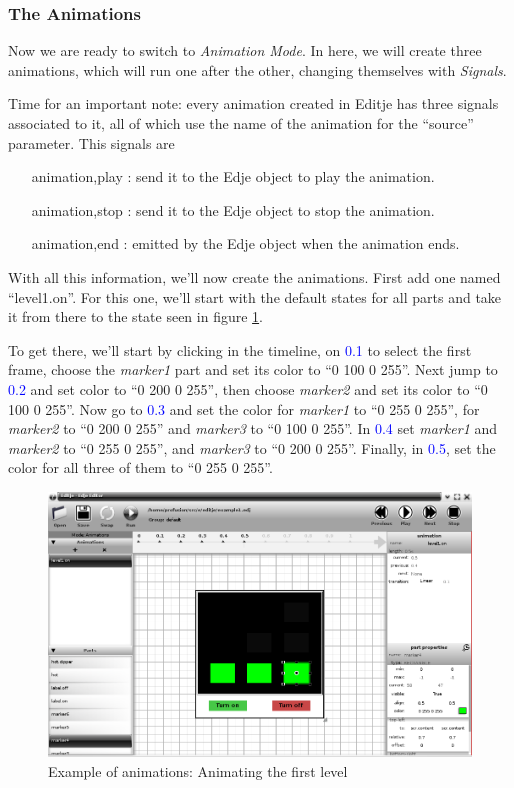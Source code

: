 \documentclass[a4paper]{profusion}
\newcommand{\GUIIcon}[1]{\textcolor{blue}{#1}}    %
\begin{document}
  \subsubsection{The Animations}

Now we are ready to switch to \emph{Animation Mode}. In here, we will
create three animations, which will run one after the other, changing
themselves with \emph{Signals}.

Time for an important note: every animation created in Editje has
three signals associated to it, all of which use the name of the
animation for the ``source'' parameter. This signals are
\begin{itemize}
\item[animation,play]: send it to the Edje object to play the
  animation.
\item[animation,stop]: send it to the Edje object to stop the
  animation.
\item[animation,end]: emitted by the Edje object when the animation
  ends.
\end{itemize}

With all this information, we'll now create the animations. First add
one named ``level1.on''. For this one, we'll start with the default
states for all parts and take it from there to the state seen in
figure \ref{fig:anim1_level1}.

To get there, we'll start by clicking in the timeline, on
\GUIIcon{0.1} to select the first frame, choose the \emph{marker1}
part and set its color to ``0 100 0 255''. Next jump to \GUIIcon{0.2}
and set color to ``0 200 0 255'', then choose \emph{marker2} and set
its color to ``0 100 0 255''. Now go to \GUIIcon{0.3} and set the
color for \emph{marker1} to ``0 255 0 255'', for \emph{marker2} to ``0
200 0 255'' and \emph{marker3} to ``0 100 0 255''.  In \GUIIcon{0.4}
set \emph{marker1} and \emph{marker2} to ``0 255 0 255'', and
\emph{marker3} to ``0 200 0 255''. Finally, in \GUIIcon{0.5}, set the
color for all three of them to ``0 255 0 255''.

\begin{figure}[h!]
  \centering
  \includegraphics[width=1.0\textwidth]{examples/anim1_level1.png}
  \caption{Example of animations: Animating the first level}
  \label{fig:anim1_level1}
\end{figure}
\end{document}
